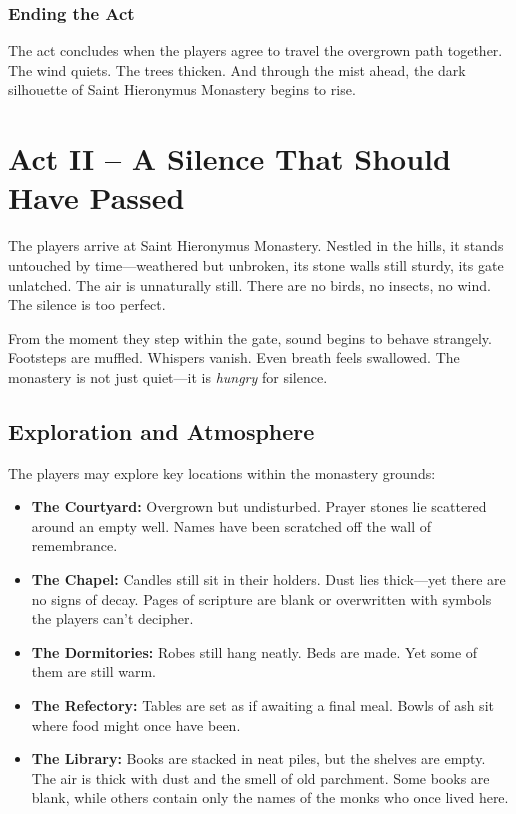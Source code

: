 \documentclass[nodeprecatedcode,bg=print]{dndbook/dndbook}
\begin{document}
\subsubsection{Ending the Act} The act concludes when the players agree to travel the overgrown path together. The wind quiets. The trees thicken. And through the mist ahead, the dark silhouette of Saint Hieronymus Monastery begins to rise.


\section*{Act II – A Silence That Should Have Passed}

The players arrive at Saint Hieronymus Monastery. Nestled in the hills, it stands untouched by time—weathered but unbroken, its stone walls still sturdy, its gate unlatched. The air is unnaturally still. There are no birds, no insects, no wind. The silence is too perfect.

From the moment they step within the gate, sound begins to behave strangely. Footsteps are muffled. Whispers vanish. Even breath feels swallowed. The monastery is not just quiet—it is \emph{hungry} for silence.


\subsection{Exploration and Atmosphere}

The players may explore key locations within the monastery grounds:
\begin{WyrdExample}[Locations]
    \begin{itemize}
        \item \textbf{The Courtyard:} Overgrown but undisturbed. Prayer stones lie scattered around an empty well. Names have been scratched off the wall of remembrance.
        \item \textbf{The Chapel:} Candles still sit in their holders. Dust lies thick—yet there are no signs of decay. Pages of scripture are blank or overwritten with symbols the players can’t decipher.
        \item \textbf{The Dormitories:} Robes still hang neatly. Beds are made. Yet some of them are still warm.
        \item \textbf{The Refectory:} Tables are set as if awaiting a final meal. Bowls of ash sit where food might once have been.
        \item \textbf{The Library:} Books are stacked in neat piles, but the shelves are empty. The air is thick with dust and the smell of old parchment. Some books are blank, while others contain only the names of the monks who once lived here.
    \end{itemize}
\end{WyrdExample}
\end{document}
